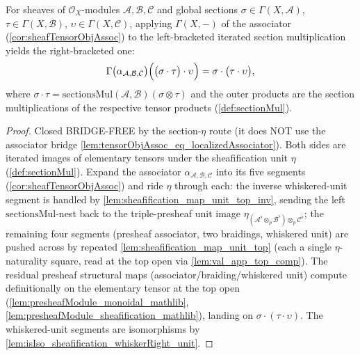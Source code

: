 \begin{lemma}
  \label{lem:sectionMul_assoc_core}
  For sheaves of \(\mathcal{O}_X\)-modules \(\mathcal{A}, \mathcal{B},
  \mathcal{C}\) and global sections \(\sigma \in \Gamma(X,\mathcal{A})\),
  \(\tau \in \Gamma(X,\mathcal{B})\), \(\upsilon \in \Gamma(X,\mathcal{C})\),
  applying \(\Gamma(X,-)\) of the associator (\cref{cor:sheafTensorObjAssoc}) to
  the left-bracketed iterated section multiplication yields the right-bracketed
  one:
  \[
    \Gamma\bigl(\alpha_{\mathcal{A},\mathcal{B},\mathcal{C}}\bigr)
      \Bigl( \bigl(\sigma \cdot \tau\bigr) \cdot \upsilon \Bigr)
      = \sigma \cdot \bigl(\tau \cdot \upsilon\bigr),
  \]
  where \(\sigma \cdot \tau = \mathrm{sectionsMul}(\mathcal{A},\mathcal{B})
  (\sigma \otimes \tau)\) and the outer products are the section multiplications
  of the respective tensor products (\cref{def:sectionMul}).
\end{lemma}

\begin{proof}
  Closed BRIDGE-FREE by the section-\(\eta\) route (it does NOT use the associator
  bridge \cref{lem:tensorObjAssoc_eq_localizedAssociator}). Both sides are iterated
  images of elementary tensors under the sheafification unit \(\eta\)
  (\cref{def:sectionMul}). Expand the associator
  \(\alpha_{\mathcal{A},\mathcal{B},\mathcal{C}}\) into its five segments
  (\cref{cor:sheafTensorObjAssoc}) and ride \(\eta\) through each: the inverse
  whiskered-unit segment is handled by
  \cref{lem:sheafification_map_unit_top_inv}, sending the left
  \(\mathrm{sectionsMul}\)-nest back to the triple-presheaf unit image
  \(\eta_{(\mathcal{A}^{\flat} \otimes_p \mathcal{B}^{\flat}) \otimes_p
  \mathcal{C}^{\flat}}\); the remaining four segments (presheaf associator, two
  braidings, whiskered unit) are pushed across by repeated
  \cref{lem:sheafification_map_unit_top} (each a single \(\eta\)-naturality square,
  read at the top open via \cref{lem:val_app_top_comp}). The residual presheaf
  structural maps (associator/braiding/whiskered unit) compute definitionally on
  the elementary tensor at the top open (\cref{lem:presheafModule_monoidal_mathlib},
  \cref{lem:presheafModule_sheafification_mathlib}), landing on
  \(\sigma \cdot (\tau \cdot \upsilon)\). The whiskered-unit segments are
  isomorphisms by \cref{lem:isIso_sheafification_whiskerRight_unit}.
\end{proof}

